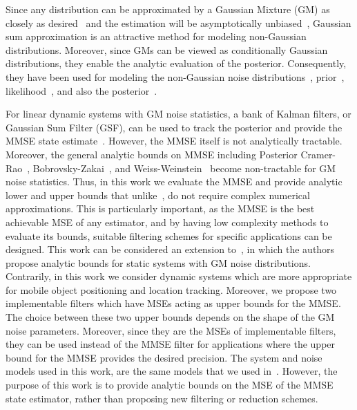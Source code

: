 \documentclass[10pt,twocolumn,twoside]{IEEEtran}
\begin{document}
Since any distribution can be approximated by a Gaussian Mixture (GM) as closely as desired~\cite{anderson1979optimal} and the estimation will be asymptotically unbiased~\cite{1962KernelDensityEstimation}, Gaussian sum approximation is an attractive method for modeling non-Gaussian distributions. Moreover, since GMs can be viewed as conditionally Gaussian distributions, they enable the analytic evaluation of the posterior. Consequently, they have been used for modeling the non-Gaussian noise distributions~\cite{bar2001estimation,GPFkotecha_gaussian_2003,chen_mixture_2000,alspach_nonlinear_1972,sorenson_recursive_1971,schoenberg_posterior_2012,kemouche_gmm_2010,bilik_mmse-based_2010,sun_mixture_2004,ali-loytty_box_2010,faubel_split_2009,wang_novel_2012,bilik_optimal_2005,daeipour_interacting_1995,pishdad_indoor_2012,pishdad_optimal_2013}, prior~\cite{anderson1979optimal,alspach_nonlinear_1972,sorenson_recursive_1971,flament_particle_2004,maybeck_multiple_2005,morelande_manoeuvring_2005,lehn-schioler_parzen_2004,bilik_optimal_2005}, likelihood~\cite{huber_efficient_2007}, and also the posterior~\cite{ito_gaussian_2000,GPFkotecha_gaussian_2003,schoenberg_posterior_2012,terejanu_adaptive_2011,bilik_maneuvering_2010,faubel_split_2009,wang_novel_2012,djuric_density_2004,schrempf_efficient_2007,bethel_pdf_2010}.

For linear dynamic systems with GM noise statistics, a bank of Kalman filters, or Gaussian Sum Filter (GSF), can be used to track the posterior and provide the MMSE state estimate~\cite{ackerson_state_1970,bar2001estimation}. However, the MMSE itself is not analytically tractable. Moreover, the general analytic bounds on MMSE including Posterior Cramer-Rao~\cite{tichavsky_posterior_1998}, Bobrovsky-Zakai~\cite{bobrovsky_lower_1976}, and Weiss-Weinstein~\cite{weiss_lower_1985,xaver_analytic_2013} become non-tractable for GM noise statistics. Thus, in this work we evaluate the MMSE and provide analytic lower and upper bounds that unlike~\cite{svensson_bayesian_2010,tulsyan_particle_2013}, do not require complex numerical approximations. This is particularly important, as the MMSE is the best achievable MSE of any estimator, and by having low complexity methods to evaluate its bounds, suitable filtering schemes for specific applications can be designed. This work can be considered an extension to~\cite{flam_mmse_2012}, in which the authors propose analytic bounds for static systems with GM noise distributions. Contrarily, in this work we consider dynamic systems which are more appropriate for mobile object positioning and location tracking. Moreover, we propose two implementable filters which have MSEs acting as upper bounds for the MMSE. The choice between these two upper bounds depends on the shape of the GM noise parameters. Moreover, since they are the MSEs of implementable filters, they can be used instead of the MMSE filter for applications where the upper bound for the MMSE provides the desired precision. The system and noise models used in this work, are the same models that we used in~\cite{pishdad_approximate_2014,pishdad_new_2014}. However, the purpose of this work is to provide analytic bounds on the MSE of the MMSE state estimator, rather than proposing new filtering or reduction schemes.
\end{document}
